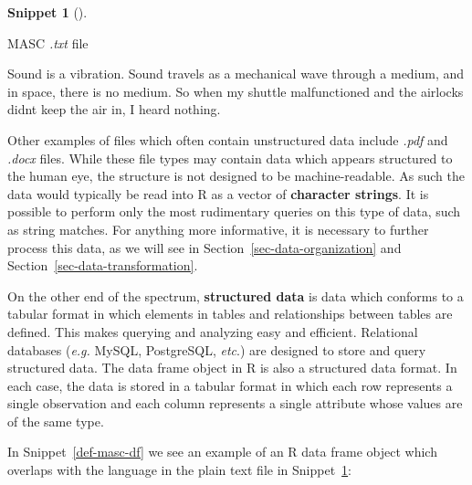 \documentclass[
  letterpaper,
  krantz1]{latex/krantz-mod}
\newenvironment{Shaded}{\begin{snugshade}}{\end{snugshade}}
\newcommand{\NormalTok}[1]{\textcolor[rgb]{0.00,0.00,0.00}{#1}}
\theoremstyle{definition}
\theoremstyle{definition}
\newtheorem{definition}{Snippet}[chapter]
\theoremstyle{remark}
\begin{document}
\begin{definition}[]\protect\hypertarget{def-masc-text}{}\label{def-masc-text}

MASC \emph{.txt} file

\begin{Shaded}
\begin{Highlighting}[]
\NormalTok{Sound is a vibration. Sound travels as a mechanical wave through a medium, and in space, there is no medium. So when my shuttle malfunctioned and the airlocks didn\textquotesingle{}t keep the air in, I heard nothing.}
\end{Highlighting}
\end{Shaded}

\end{definition}

Other examples of files which often contain unstructured data include
\emph{.pdf} and \emph{.docx} files. While these file types may contain
data which appears structured to the human eye, the structure is not
designed to be machine-readable. As such the data would typically be
read into R as a vector of \textbf{character strings}. It is possible to
perform only the most rudimentary queries on this type of data, such as
string matches. For anything more informative, it is necessary to
further process this data, as we will see in
Section~\ref{sec-data-organization} and
Section~\ref{sec-data-transformation}.

On the other end of the spectrum, \textbf{structured data} is data which
conforms to a tabular format in which elements in tables and
relationships between tables are defined. This makes querying and
analyzing easy and efficient. Relational databases (\emph{e.g.} MySQL,
PostgreSQL, \emph{etc}.) are designed to store and query structured
data. The data frame object in R is also a structured data format. In
each case, the data is stored in a tabular format in which each row
represents a single observation and each column represents a single
attribute whose values are of the same type.

In Snippet~\ref{def-masc-df} we see an example of an R data frame object
which overlaps with the language in the plain text file in
Snippet~\ref{def-masc-text}:
\end{document}
